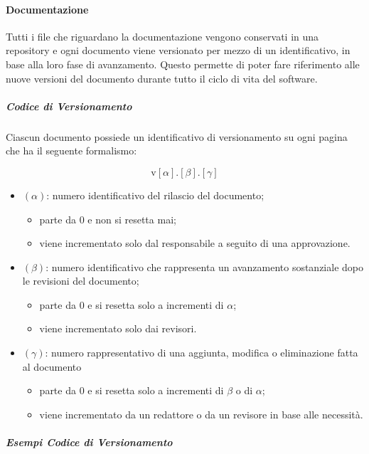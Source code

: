 	\paragraph{Documentazione}

	Tutti i file che riguardano la documentazione vengono conservati in una repository e ogni documento viene versionato per mezzo di un identificativo, in base alla loro fase di avanzamento. Questo permette di poter fare riferimento alle nuove versioni del documento durante tutto il ciclo di vita del software.\\

		\subparagraph{Codice di Versionamento}

		Ciascun documento possiede un identificativo di versionamento su ogni pagina che ha il seguente formalismo:

		\[%
			\text{v}[\alpha].[\beta].[\gamma]
		\]

		\begin{itemize}
			\item \((\alpha)\): numero identificativo del rilascio del documento;
			\begin{itemize}
				\item parte da 0 e non si resetta mai;
				\item viene incrementato solo dal responsabile a seguito di una approvazione.
			\end{itemize}
			\item \((\beta)\): numero identificativo che rappresenta un avanzamento sostanziale dopo le revisioni del documento;
			\begin{itemize}
				\item parte da 0 e si resetta solo a incrementi di \(\alpha\);
				\item viene incrementato solo dai revisori.
			\end{itemize}
			\item \((\gamma)\): numero rappresentativo di una aggiunta, modifica o eliminazione fatta al documento
			\begin{itemize}
				\item parte da 0 e si resetta solo a incrementi di \(\beta\) o di \(\alpha\);
				\item viene incrementato da un redattore o da un revisore in base alle necessità. 
			\end{itemize}
		\end{itemize}

		\subparagraph{Esempi Codice di Versionamento} 
		

